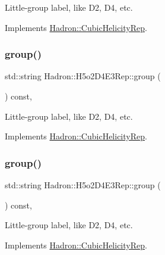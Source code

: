 Little-\/group label, like D2, D4, etc. 

Implements \mbox{\hyperlink{structHadron_1_1CubicHelicityRep_a101a7d76cd8ccdad0f272db44b766113}{Hadron\+::\+Cubic\+Helicity\+Rep}}.

\mbox{\label{structHadron_1_1H5o2D4E3Rep_a5761659c1554a5eadb627eb60ce49afa}} 
\subsubsection{\texorpdfstring{group()}{group()}\hspace{0.1cm}{\footnotesize\ttfamily [3/5]}}
{\footnotesize\ttfamily std\+::string Hadron\+::\+H5o2\+D4\+E3\+Rep\+::group (\begin{DoxyParamCaption}{ }\end{DoxyParamCaption}) const\hspace{0.3cm}{\ttfamily [inline]}, {\ttfamily [virtual]}}

Little-\/group label, like D2, D4, etc. 

Implements \mbox{\hyperlink{structHadron_1_1CubicHelicityRep_a101a7d76cd8ccdad0f272db44b766113}{Hadron\+::\+Cubic\+Helicity\+Rep}}.

\mbox{\label{structHadron_1_1H5o2D4E3Rep_a5761659c1554a5eadb627eb60ce49afa}} 
\subsubsection{\texorpdfstring{group()}{group()}\hspace{0.1cm}{\footnotesize\ttfamily [4/5]}}
{\footnotesize\ttfamily std\+::string Hadron\+::\+H5o2\+D4\+E3\+Rep\+::group (\begin{DoxyParamCaption}{ }\end{DoxyParamCaption}) const\hspace{0.3cm}{\ttfamily [inline]}, {\ttfamily [virtual]}}

Little-\/group label, like D2, D4, etc. 

Implements \mbox{\hyperlink{structHadron_1_1CubicHelicityRep_a101a7d76cd8ccdad0f272db44b766113}{Hadron\+::\+Cubic\+Helicity\+Rep}}.

